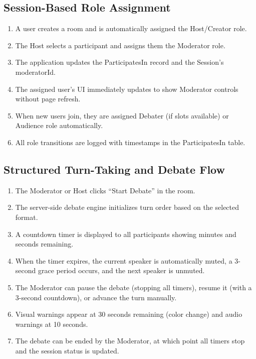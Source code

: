 \documentclass[12pt]{article}
\begin{document}
\subsection{Session-Based Role Assignment}

\begin{enumerate}
    \item A user creates a room and is automatically assigned the Host/Creator role.
    \item The Host selects a participant and assigns them the Moderator role.
    \item The application updates the ParticipatesIn record and the Session's moderatorId.
    \item The assigned user's UI immediately updates to show Moderator controls without page refresh.
    \item When new users join, they are assigned Debater (if slots available) or Audience role automatically.
    \item All role transitions are logged with timestamps in the ParticipatesIn table.
\end{enumerate}

\subsection{Structured Turn-Taking and Debate Flow}

\begin{enumerate}
    \item The Moderator or Host clicks ``Start Debate'' in the room.
    \item The server-side debate engine initializes turn order based on the selected format.
    \item A countdown timer is displayed to all participants showing minutes and seconds remaining.
    \item When the timer expires, the current speaker is automatically muted, a 3-second grace period occurs, and the next speaker is unmuted.
    \item The Moderator can pause the debate (stopping all timers), resume it (with a 3-second countdown), or advance the turn manually.
    \item Visual warnings appear at 30 seconds remaining (color change) and audio warnings at 10 seconds.
    \item The debate can be ended by the Moderator, at which point all timers stop and the session status is updated.
\end{enumerate}
\end{document}
